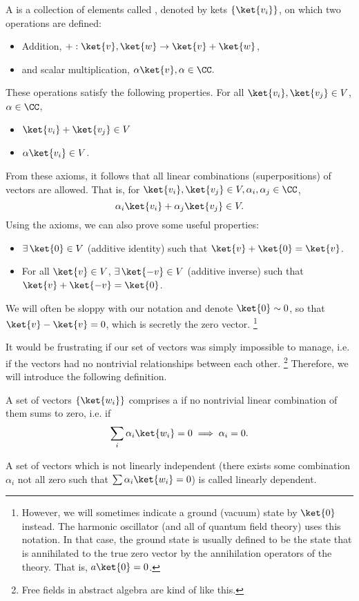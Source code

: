 \begin{defn}
    A  is a collection of elements called , denoted by kets $\set{\ket{v_i}}$, on which two operations are defined: 
    \begin{itemize}
        \item Addition, $+: \ket{v},\ket{w}\to \ket{v}+\ket{w}$,
        \item and scalar multiplication, $\alpha \ket{v}, \alpha \in \CC.$
    \end{itemize} 
    These operations satisfy the following properties. For all $\ket{v_i},\ket{v_j}\in V$, $\alpha\in \CC$,
    \begin{itemize}
        \item $\ket{v_i}+\ket{v_j}\in V$
        \item $\alpha\ket{v_i} \in V$.
    \end{itemize}
\end{defn}

From these axioms, it follows that all linear combinations (superpositions) of vectors are allowed. That is, for $\ket{v_i},\ket{v_j}\in V, \alpha_i,\alpha_j\in \CC$,
\begin{equation}
    \alpha_i \ket{v_i} +\alpha_j \ket{v_j}\in V.
\end{equation}
%
Using the axioms, we can also prove some useful properties:
\begin{itemize}
    \item $\exists\, \ket{0}\in V$ (additive identity) such that $\ket{v}+\ket{0}=\ket{v}$.
    \item For all $\ket{v}\in V$, $\exists\, \ket{-v} \in V$ (additive inverse) such that $\ket{v}+\ket{-v}=\ket{0}$.
\end{itemize}
We will often be sloppy with our notation and denote $\ket{0}\sim 0$, so that $\ket{v}-\ket{v}=0$, which is secretly the zero vector.%
    \footnote{However, we will sometimes indicate a ground (vacuum) state by $\ket{0}$ instead. The harmonic oscillator (and all of quantum field theory) uses this notation. In that case, the ground state is usually defined to be the state that is annihilated to the true zero vector by the annihilation operators of the theory. That is, $a\ket{0}=0$.}

It would be frustrating if our set of vectors was simply impossible to manage, i.e. if the vectors had no nontrivial relationships between each other.%
    \footnote{Free fields in abstract algebra are kind of like this.}
Therefore, we will introduce the following definition.
\begin{defn}
    A set of vectors $\set{\ket{w_i}}$ comprises a  if no nontrivial linear combination of them sums to zero, i.e. if
    \begin{equation}
        \sum_i \alpha_i \ket{w_i} =0 \implies \alpha_i = 0.
    \end{equation}
\end{defn}
\begin{defn}
    A set of vectors which is not linearly independent (there exists some combination $\alpha_i$ not all zero such that $\sum \alpha_i \ket{w_i}=0$) is called linearly dependent.
\end{defn}

